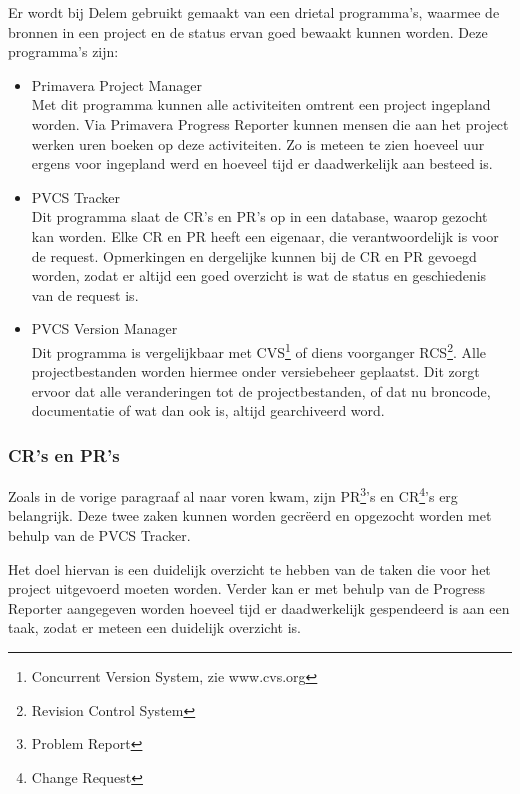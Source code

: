 
Er wordt bij Delem gebruikt gemaakt van een drietal programma's, waarmee de bronnen in een project en de status ervan goed bewaakt kunnen worden. Deze programma's zijn:

\begin{itemize}
\item Primavera Project Manager\\
Met dit programma kunnen alle activiteiten omtrent een project ingepland worden. Via Primavera Progress Reporter kunnen mensen die aan het project werken uren boeken op deze activiteiten. Zo is meteen te zien hoeveel uur ergens voor ingepland werd en hoeveel tijd er daadwerkelijk aan besteed is.
\item PVCS Tracker\\
Dit programma slaat de CR's en PR's op in een database, waarop gezocht kan worden. Elke CR en PR heeft een eigenaar, die verantwoordelijk is voor de request. Opmerkingen en dergelijke kunnen bij de CR en PR gevoegd worden, zodat er altijd een goed overzicht is wat de status en geschiedenis van de request is.
\item PVCS Version Manager\\
Dit programma is vergelijkbaar met CVS\footnote{Concurrent Version System, zie www.cvs.org} of diens voorganger RCS\footnote{Revision Control System}. Alle projectbestanden worden hiermee onder versiebeheer geplaatst. Dit zorgt ervoor dat alle veranderingen tot de projectbestanden, of dat nu broncode, documentatie of wat dan ook is, altijd gearchiveerd word.
\end{itemize}

\subsubsection{CR's en PR's}

\label{PR}
\label{CR}

Zoals in de vorige paragraaf al naar voren kwam, zijn PR\footnote{Problem Report}'s en CR\footnote{Change Request}'s erg belangrijk. Deze twee zaken kunnen worden gecr\"eerd en opgezocht worden met behulp van de PVCS Tracker.

Het doel hiervan is een duidelijk overzicht te hebben van de taken die voor het project uitgevoerd moeten worden. Verder kan er met behulp van de Progress Reporter aangegeven worden hoeveel tijd er daadwerkelijk gespendeerd is aan een taak, zodat er meteen een duidelijk overzicht is.

